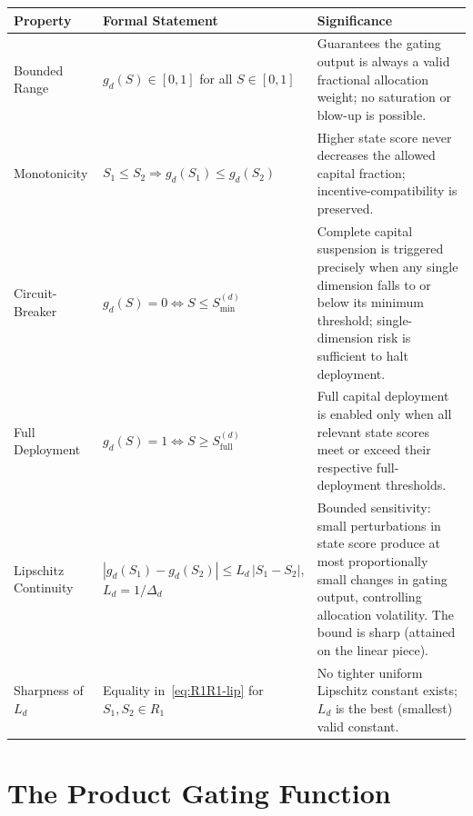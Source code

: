 \documentclass[12pt,openany]{book}
\numberwithin{equation}{chapter}
\theoremstyle{plain}
\theoremstyle{definition}
\theoremstyle{remark}
\def\mathcal#1{#1}%
\begin{document}
\begin{center}
\begin{tabularx}{\linewidth}{@{} l X X @{}}
\toprule
\textbf{Property} &
\textbf{Formal Statement} &
\textbf{Significance} \\
\midrule
Bounded Range &
$g_d(\mathcal{S}) \in [0,1]$ for all
$\mathcal{S} \in [0,1]$ &
Guarantees the gating output is always a valid
fractional allocation weight; no saturation or
blow-up is possible. \\[4pt]
Monotonicity &
$\mathcal{S}_1 \leq \mathcal{S}_2 \Rightarrow
g_d(\mathcal{S}_1) \leq g_d(\mathcal{S}_2)$ &
Higher state score never decreases the allowed
capital fraction; incentive-compatibility is
preserved. \\[4pt]
Circuit-Breaker &
$g_d(\mathcal{S})=0 \Leftrightarrow
\mathcal{S} \leq \mathcal{S}_{\min}^{(d)}$ &
Complete capital suspension is triggered
precisely when any single dimension falls to or
below its minimum threshold; single-dimension
risk is sufficient to halt deployment. \\[4pt]
Full Deployment &
$g_d(\mathcal{S})=1 \Leftrightarrow
\mathcal{S} \geq \mathcal{S}_{\mathrm{full}}^{(d)}$ &
Full capital deployment is enabled only when
all relevant state scores meet or exceed their
respective full-deployment thresholds. \\[4pt]
Lipschitz Continuity &
$|g_d(\mathcal{S}_1)-g_d(\mathcal{S}_2)|
 \leq L_d\,|\mathcal{S}_1-\mathcal{S}_2|$,\newline
$L_d = 1/\Delta_d$ &
Bounded sensitivity: small perturbations in
state score produce at most proportionally
small changes in gating output, controlling
allocation volatility. The bound is sharp
(attained on the linear piece). \\[4pt]
Sharpness of $L_d$ &
Equality in~\eqref{eq:R1R1-lip} for
$\mathcal{S}_1,\mathcal{S}_2 \in R_1$ &
No tighter uniform Lipschitz constant exists;
$L_d$ is the best (smallest) valid constant. \\
\bottomrule
\end{tabularx}
\end{center}

\section{The Product Gating Function}
\end{document}
